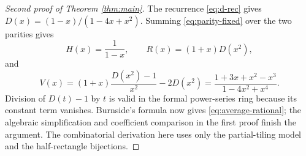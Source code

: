 \begin{proof}[Second proof of Theorem \ref{thm:main}]
The recurrence \eqref{eq:d-rec} gives
$D(x)=(1-x)/(1-4x+x^2)$.
Summing \eqref{eq:parity-fixed} over the two parities gives
\[
 H(x)=\frac1{1-x},\qquad R(x)=(1+x)D(x^2),
\]
and
\[
 V(x)=(1+x)\frac{D(x^2)-1}{x^2}-2D(x^2)
 =\frac{1+3x+x^2-x^3}{1-4x^2+x^4}.
\]
Division of $D(t)-1$ by $t$ is valid in the formal power-series
ring because its constant term vanishes.
Burnside's formula now gives \eqref{eq:average-rational};
the algebraic simplification and coefficient comparison in
the first proof finish the argument.
The combinatorial derivation here uses only the partial-tiling
model and the half-rectangle bijections.
\end{proof}
